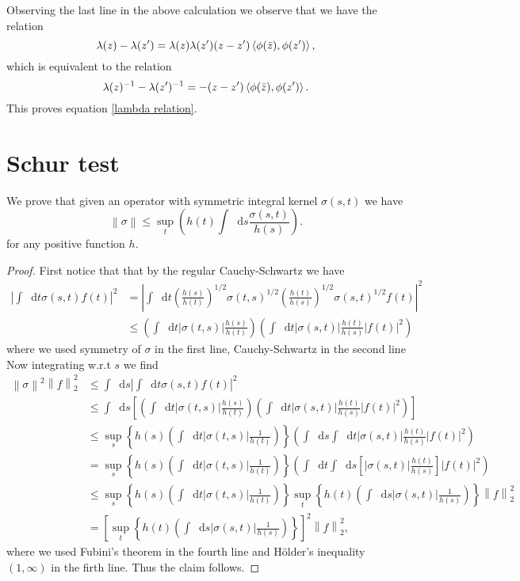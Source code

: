\documentclass[a4paper,11pt]{article}
\newcommand{\norm}[1]{\left\lVert #1 \right\rVert}
\newcommand{\abs}[1]{\left\lvert #1 \right\rvert}
\newcommand*\diff{\mathop{}\!\mathrm{d}}
\numberwithin{equation}{section}
\begin{document}
Observing the last line in the above calculation we observe that we have the relation\begin{equation}
\lambda(z)-\lambda(z')=\lambda(z)\lambda(z')(z-z')\braket{\phi(\bar{z}),\phi(z')},
\end{equation}
which is equivalent to the relation\begin{equation}
\lambda(z)^{-1}-\lambda(z')^{-1}=-(z-z')\braket{\phi(\bar{z}),\phi(z')}.
\end{equation}
This proves equation \eqref{lambda relation}.
\section{Schur test}
We prove that given an operator with symmetric integral kernel $ \sigma(s,t) $ we have\begin{equation}
\norm{\sigma}\leq\sup_{t}\left(h(t)\int\diff s \frac{\sigma(s,t)}{h(s)}\right).
\end{equation}
for any positive function $ h $.
\begin{proof}
	First notice that that by the regular Cauchy-Schwartz we have \begin{equation}
	\begin{aligned}
	\abs{\int\diff t\sigma(s,t)f(t)}^2&=\abs{\int\diff t\left(\frac{h(s)}{h(t)}\right)^{1/2}\sigma(t,s)^{1/2}\left(\frac{h(t)}{h(s)}\right)^{1/2}\sigma(s,t)^{1/2}f(t)}^2\\
	&\leq \left(\int\diff t \abs{\sigma(t,s)}\frac{h(s)}{h(t)}\right)\left(\int\diff t \abs{\sigma(s,t)}\frac{h(t)}{h(s)}\abs{f(t)}^2\right)
	\end{aligned}
	\end{equation}
	where we used symmetry of $ \sigma $ in the first line, Cauchy-Schwartz in the second line Now integrating w.r.t $ s $ we find\begin{equation}
	\begin{aligned}
	\norm{\sigma}^2\norm{f}_2^2&\leq\int\diff s	\abs{\int\diff t\sigma(s,t)f(t)}^2\\&
	\leq\int\diff s\left[\left(\int\diff t \abs{\sigma(t,s)}\frac{h(s)}{h(t)}\right)\left(\int\diff t \abs{\sigma(s,t)}\frac{h(t)}{h(s)}\abs{f(t)}^2\right)\right]\\&
	\leq\sup_{s}\left\{h(s)\left(\int\diff t \abs{\sigma(t,s)}\frac{1}{h(t)}\right)\right\}\left(\int\diff s\int\diff t \abs{\sigma(s,t)}\frac{h(t)}{h(s)}\abs{f(t)}^2\right)
	\\&
	=\sup_{s}\left\{h(s)\left(\int\diff t \abs{\sigma(t,s)}\frac{1}{h(t)}\right)\right\}\left(\int\diff t\int\diff s\left[ \abs{\sigma(s,t)}\frac{h(t)}{h(s)}\right]\abs{f(t)}^2\right)
	\\&
	\leq\sup_{s}\left\{h(s)\left(\int\diff t \abs{\sigma(t,s)}\frac{1}{h(t)}\right)\right\}\sup_{t}\left\{h(t)\left(\int\diff s \abs{\sigma(s,t)}\frac{1}{h(s)}\right)\right\}\norm{f}^2_2
	\\&=\left[\sup_{t}\left\{h(t)\left(\int\diff s \abs{\sigma(s,t)}\frac{1}{h(s)}\right)\right\}\right]^2\norm{f}^2_2,
	\end{aligned}
	\end{equation}
	where we used Fubini's theorem in the fourth line and H\"older's inequality $ (1,\infty) $ in the firth line.
	Thus the claim follows.
\end{proof}


\end{document}
